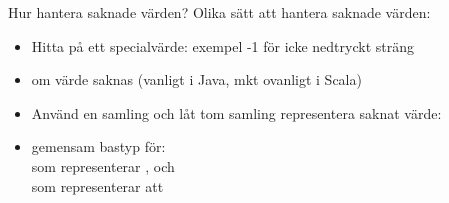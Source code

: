


\ifkompendium\else
{
\begin{frame}[plain]
\end{frame}
}
\fi


\begin{Slide}{Hur hantera saknade värden?}\SlideFontSmall
Olika sätt att hantera saknade värden:
\begin{itemize}
\item Hitta på ett specialvärde: exempel -1 för icke nedtryckt sträng
\item {} om värde saknas (vanligt i Java, mkt ovanligt i Scala)
\item Använd en samling och låt tom samling representera saknat värde: \\

\item {} gemensam bastyp för: \\
   som representerar , och \\  som representerar att 
\end{itemize}
\end{Slide}



